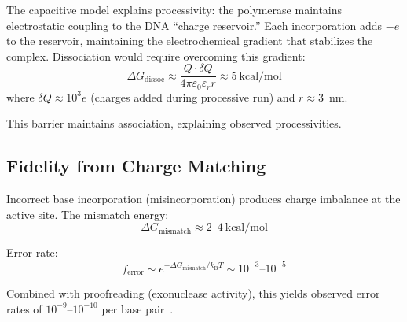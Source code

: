 \documentclass[twocolumn,aps,prb,superscriptaddress,longbibliography,floatfix]{revtex4-2}
\theoremstyle{remark}
\newcommand{\kB}{k_\text{B}}
\begin{document}
The capacitive model explains processivity: the polymerase maintains
electrostatic coupling to the DNA ``charge reservoir.'' Each
incorporation adds $-e$ to the reservoir, maintaining the
electrochemical gradient that stabilizes the complex. Dissociation
would require overcoming this gradient:
\begin{equation}
\Delta G_\text{dissoc} \approx \frac{Q \cdot \delta Q}{4\pi\varepsilon_0\varepsilon_r r} \approx 5~\text{kcal/mol}
\end{equation}
where $\delta Q \approx 10^3 e$ (charges added during processive run)
and $r \approx 3$~nm.

This barrier maintains association, explaining observed processivities.

\subsection{Fidelity from Charge Matching}

Incorrect base incorporation (misincorporation) produces charge
imbalance at the active site. The mismatch energy:
\begin{equation}
\Delta G_\text{mismatch} \approx 2\text{--}4~\text{kcal/mol}
\end{equation}

Error rate:
\begin{equation}
f_\text{error} \sim e^{-\Delta G_\text{mismatch}/\kB T} \sim 10^{-3}\text{--}10^{-5}
\end{equation}

Combined with proofreading (exonuclease activity), this yields observed
error rates of $10^{-9}$--$10^{-10}$ per base pair~\cite{Kunkel2004}.
\end{document}
